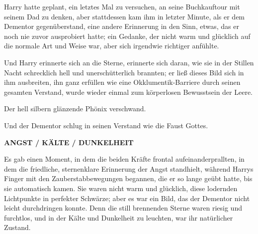 Harry hatte geplant, ein letztes Mal zu versuchen, an seine Buchkauftour mit seinem Dad zu denken, aber stattdessen kam ihm in letzter Minute, als er dem Dementor gegenüberstand, eine andere Erinnerung in den Sinn, etwas, das er noch nie zuvor ausprobiert hatte; ein Gedanke, der nicht warm und glücklich auf die normale Art und Weise war, aber sich irgendwie richtiger anfühlte.

Und Harry erinnerte sich an die Sterne, erinnerte sich daran, wie sie in der Stillen Nacht schrecklich hell und unerschütterlich brannten; er ließ dieses Bild sich in ihm ausbreiten, ihn ganz erfüllen wie eine Okklumentik-Barriere durch seinen gesamten Verstand, wurde wieder einmal zum körperlosen Bewusstsein der Leere.

Der hell silbern glänzende Phönix verschwand.

Und der Dementor schlug in seinen Verstand wie die Faust Gottes.

\textbf{ANGST / KÄLTE / DUNKELHEIT}

Es gab einen Moment, in dem die beiden Kräfte frontal aufeinanderprallten, in dem die friedliche, sternenklare Erinnerung der Angst standhielt, während Harrys Finger mit den Zauberstabbewegungen begannen, die er so lange geübt hatte, bis sie automatisch kamen. Sie waren nicht warm und glücklich, diese lodernden Lichtpunkte in perfekter Schwärze; aber es war ein Bild, das der Dementor nicht leicht durchdringen konnte. Denn die still brennenden Sterne waren riesig und furchtlos, und in der Kälte und Dunkelheit zu leuchten, war ihr natürlicher Zustand.

